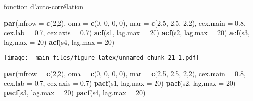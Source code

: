 \documentclass[
]{book}
\newenvironment{Shaded}{\begin{snugshade}}{\end{snugshade}}
\newcommand{\AttributeTok}[1]{\textcolor[rgb]{0.13,0.29,0.53}{#1}}
\newcommand{\DecValTok}[1]{\textcolor[rgb]{0.00,0.00,0.81}{#1}}
\newcommand{\FloatTok}[1]{\textcolor[rgb]{0.00,0.00,0.81}{#1}}
\newcommand{\FunctionTok}[1]{\textcolor[rgb]{0.13,0.29,0.53}{\textbf{#1}}}
\newcommand{\NormalTok}[1]{#1}
\theoremstyle{definition}
\theoremstyle{definition}
\theoremstyle{definition}
\theoremstyle{definition}
\theoremstyle{remark}
\begin{document}
fonction d'auto-corrélation

\begin{Shaded}
\begin{Highlighting}[]
\FunctionTok{par}\NormalTok{(}\AttributeTok{mfrow =} \FunctionTok{c}\NormalTok{(}\DecValTok{2}\NormalTok{,}\DecValTok{2}\NormalTok{), }\AttributeTok{oma =} \FunctionTok{c}\NormalTok{(}\DecValTok{0}\NormalTok{, }\DecValTok{0}\NormalTok{, }\DecValTok{0}\NormalTok{, }\DecValTok{0}\NormalTok{), }\AttributeTok{mar =} \FunctionTok{c}\NormalTok{(}\FloatTok{2.5}\NormalTok{, }\FloatTok{2.5}\NormalTok{, }\DecValTok{2}\NormalTok{,}\DecValTok{2}\NormalTok{), }\AttributeTok{cex.main =} \FloatTok{0.8}\NormalTok{, }\AttributeTok{cex.lab =} \FloatTok{0.7}\NormalTok{, }\AttributeTok{cex.axis =} \FloatTok{0.7}\NormalTok{)}
\FunctionTok{acf}\NormalTok{(s1, }\AttributeTok{lag.max =} \DecValTok{20}\NormalTok{)}
\FunctionTok{acf}\NormalTok{(s2, }\AttributeTok{lag.max =} \DecValTok{20}\NormalTok{)}
\FunctionTok{acf}\NormalTok{(s3, }\AttributeTok{lag.max =} \DecValTok{20}\NormalTok{)}
\FunctionTok{acf}\NormalTok{(s4, }\AttributeTok{lag.max =} \DecValTok{20}\NormalTok{)}
\end{Highlighting}
\end{Shaded}

\texttt{[image: \_main\_files/figure-latex/unnamed-chunk-21-1.pdf]}

\begin{Shaded}
\begin{Highlighting}[]
\FunctionTok{par}\NormalTok{(}\AttributeTok{mfrow =} \FunctionTok{c}\NormalTok{(}\DecValTok{2}\NormalTok{,}\DecValTok{2}\NormalTok{), }\AttributeTok{oma =} \FunctionTok{c}\NormalTok{(}\DecValTok{0}\NormalTok{, }\DecValTok{0}\NormalTok{, }\DecValTok{0}\NormalTok{, }\DecValTok{0}\NormalTok{), }\AttributeTok{mar =} \FunctionTok{c}\NormalTok{(}\FloatTok{2.5}\NormalTok{, }\FloatTok{2.5}\NormalTok{, }\DecValTok{2}\NormalTok{,}\DecValTok{2}\NormalTok{), }\AttributeTok{cex.main =} \FloatTok{0.8}\NormalTok{, }\AttributeTok{cex.lab =} \FloatTok{0.7}\NormalTok{, }\AttributeTok{cex.axis =} \FloatTok{0.7}\NormalTok{)}
\FunctionTok{pacf}\NormalTok{(s1, }\AttributeTok{lag.max =} \DecValTok{20}\NormalTok{)}
\FunctionTok{pacf}\NormalTok{(s2, }\AttributeTok{lag.max =} \DecValTok{20}\NormalTok{)}
\FunctionTok{pacf}\NormalTok{(s3, }\AttributeTok{lag.max =} \DecValTok{20}\NormalTok{)}
\FunctionTok{pacf}\NormalTok{(s4, }\AttributeTok{lag.max =} \DecValTok{20}\NormalTok{)}
\end{Highlighting}
\end{Shaded}
\end{document}
